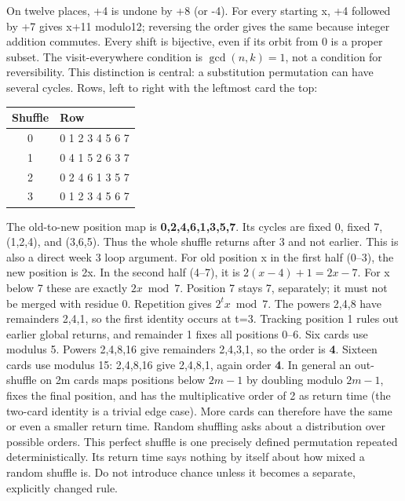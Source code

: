\documentclass[12pt]{extarticle}
\begin{document}
\newpage
{}
On twelve places, +4 is undone by +8 (or -4). For every starting x, +4 followed by +7 gives x+11 modulo12; reversing the order gives the same because integer addition commutes. Every shift is bijective, even if its orbit from 0 is a proper subset. The visit-everywhere condition is \(\gcd(n,k)=1\), not a condition for reversibility. This distinction is central: a substitution permutation can have several cycles.
Rows, left to right with the leftmost card the top:
\begin{center}\renewcommand{\arraystretch}{1.5}\begin{tabular}{c|l}Shuffle&Row\\\hline 0&0 1 2 3 4 5 6 7\\1&0 4 1 5 2 6 3 7\\2&0 2 4 6 1 3 5 7\\3&0 1 2 3 4 5 6 7\end{tabular}\end{center}
The old-to-new position map is \textbf{0,2,4,6,1,3,5,7}. Its cycles are fixed 0, fixed 7, (1,2,4), and (3,6,5). Thus the whole shuffle returns after 3 and not earlier. This is also a direct week 3 loop argument.
For old position x in the first half (0--3), the new position is 2x. In the second half (4--7), it is \(2(x-4)+1=2x-7\). For x below 7 these are exactly \(2x\bmod7\). Position 7 stays 7, separately; it must not be merged with residue 0. Repetition gives \(2^t x\bmod7\). The powers 2,4,8 have remainders 2,4,1, so the first identity occurs at t=3. Tracking position 1 rules out earlier global returns, and remainder 1 fixes all positions 0--6.
Six cards use modulus 5. Powers 2,4,8,16 give remainders 2,4,3,1, so the order is \textbf{4}. Sixteen cards use modulus 15: 2,4,8,16 give 2,4,8,1, again order \textbf{4}. In general an out-shuffle on 2m cards maps positions below \(2m-1\) by doubling modulo \(2m-1\), fixes the final position, and has the multiplicative order of 2 as return time (the two-card identity is a trivial edge case). More cards can therefore have the same or even a smaller return time.
Random shuffling asks about a distribution over possible orders. This perfect shuffle is one precisely defined permutation repeated deterministically. Its return time says nothing by itself about how mixed a random shuffle is. Do not introduce chance unless it becomes a separate, explicitly changed rule.
\end{document}
